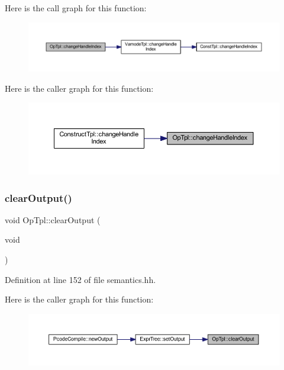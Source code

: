 Here is the call graph for this function\+:
\nopagebreak
\begin{figure}[H]
\begin{center}
\leavevmode
\includegraphics[width=350pt]{class_op_tpl_a302870e8758b00eee4237324a6d089fa_cgraph}
\end{center}
\end{figure}
Here is the caller graph for this function\+:
\nopagebreak
\begin{figure}[H]
\begin{center}
\leavevmode
\includegraphics[width=350pt]{class_op_tpl_a302870e8758b00eee4237324a6d089fa_icgraph}
\end{center}
\end{figure}
\mbox{\label{class_op_tpl_aae59dffa1447b0165891f31663529c6a}} 
\subsubsection{\texorpdfstring{clearOutput()}{clearOutput()}}
{\footnotesize\ttfamily void Op\+Tpl\+::clear\+Output (\begin{DoxyParamCaption}\item[{void}]{ }\end{DoxyParamCaption})\hspace{0.3cm}{\ttfamily [inline]}}



Definition at line 152 of file semantics.\+hh.

Here is the caller graph for this function\+:
\nopagebreak
\begin{figure}[H]
\begin{center}
\leavevmode
\includegraphics[width=350pt]{class_op_tpl_aae59dffa1447b0165891f31663529c6a_icgraph}
\end{center}
\end{figure}
\mbox{\label{class_op_tpl_ab554689cf37b6c0e96ba118835f06011}} 
